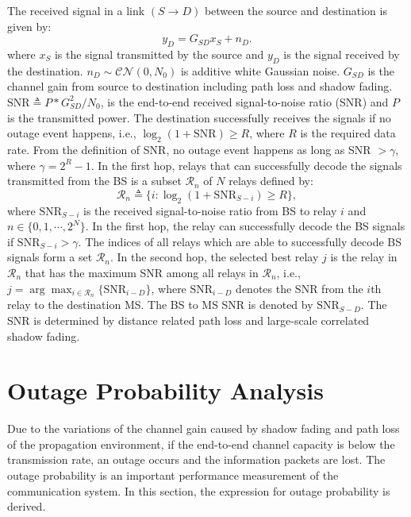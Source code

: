 \par The received signal in a link $(S\to D)$ between the source and destination is given by:
\begin{equation}
y_{D} = G_{SD}x_{S}+n_{D}.
\end{equation}
where $x_{S}$ is the signal transmitted by the source and $y_{D}$ is the signal received by the destination. $n_{D}\sim \mathcal{CN}(0,N_{0})$ is additive white Gaussian noise. $G_{SD}$ is the channel gain from source to destination including path loss and shadow fading. $\text{SNR} \triangleq P*G_{SD}^{2}/N_{0}$, is the end-to-end received signal-to-noise ratio (SNR) and $P$ is the transmitted power. The destination successfully receives the signals if no outage event happens, i.e., $\log_{2}(1+\text{SNR})\ge R$, where $R$ is the required data rate. From the definition of SNR, no outage event happens as long as SNR $> \gamma$, where $\gamma = 2^{R}-1$.
In the first hop, relays that can successfully decode the signals transmitted from the BS is a subset $\mathcal{R}_{n}$ of $N$ relays defined by:
\begin{equation}
\mathcal{R}_{n}\triangleq \{ i: \log_{2}(1+\text{SNR}_{S-i})\ge R\},
\end{equation}
where $\text{SNR}_{S-i}$ is the received signal-to-noise ratio from BS to relay $i$ and $n\in\{0,1,\cdots,2^{N}\}$.
In the first hop, the relay can successfully decode the BS signals if $\text{SNR}_{S-i}>\gamma$. The indices of all relays which are able to successfully decode BS signals form a set $\mathcal{R}_{n}$. In the second hop, the selected best relay $j$ is the relay in $\mathcal{R}_{n}$ that has the maximum SNR among all relays in $\mathcal{R}_{n}$, i.e., $j=\arg\max_{i\in \mathcal{R}_{n}}\{\text{SNR}_{i-D}\}$, where $\text{SNR}_{i-D}$ denotes the SNR from the $i$th relay to the destination MS. The BS to MS SNR is denoted by $\text{SNR}_{S-D}$. The SNR is determined by distance related path loss and large-scale correlated shadow fading.

\section{Outage Probability Analysis}
\label{sec:AA}
Due to the variations of the channel gain caused by shadow fading and path loss of the propagation environment, if the  end-to-end  channel capacity is below the transmission rate, an outage occurs and the information packets are lost. The outage probability is an important performance measurement of the communication system. In this section, the expression for outage probability is derived.

